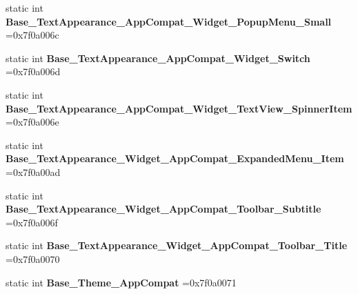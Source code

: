 \begin{DoxyCompactItemize}
\item 
\mbox{\label{classandroid_1_1support_1_1v7_1_1cardview_1_1R_1_1style_a61a73ef321f041edaa8a9b8c5e36ab07}} 
static int {\bfseries Base\+\_\+\+Text\+Appearance\+\_\+\+App\+Compat\+\_\+\+Widget\+\_\+\+Popup\+Menu\+\_\+\+Small} =0x7f0a006c
\item 
\mbox{\label{classandroid_1_1support_1_1v7_1_1cardview_1_1R_1_1style_a45c6f447e35547cd5bc3dd91d683f00c}} 
static int {\bfseries Base\+\_\+\+Text\+Appearance\+\_\+\+App\+Compat\+\_\+\+Widget\+\_\+\+Switch} =0x7f0a006d
\item 
\mbox{\label{classandroid_1_1support_1_1v7_1_1cardview_1_1R_1_1style_a775ab82cf9e9d3502a6b4f7064177639}} 
static int {\bfseries Base\+\_\+\+Text\+Appearance\+\_\+\+App\+Compat\+\_\+\+Widget\+\_\+\+Text\+View\+\_\+\+Spinner\+Item} =0x7f0a006e
\item 
\mbox{\label{classandroid_1_1support_1_1v7_1_1cardview_1_1R_1_1style_acaa1e5046618f65a78f1b80e648cd4ee}} 
static int {\bfseries Base\+\_\+\+Text\+Appearance\+\_\+\+Widget\+\_\+\+App\+Compat\+\_\+\+Expanded\+Menu\+\_\+\+Item} =0x7f0a00ad
\item 
\mbox{\label{classandroid_1_1support_1_1v7_1_1cardview_1_1R_1_1style_ab5e8f557863792e480d5cff2ed85e661}} 
static int {\bfseries Base\+\_\+\+Text\+Appearance\+\_\+\+Widget\+\_\+\+App\+Compat\+\_\+\+Toolbar\+\_\+\+Subtitle} =0x7f0a006f
\item 
\mbox{\label{classandroid_1_1support_1_1v7_1_1cardview_1_1R_1_1style_ad69c3285dde1661bfda00d53640876aa}} 
static int {\bfseries Base\+\_\+\+Text\+Appearance\+\_\+\+Widget\+\_\+\+App\+Compat\+\_\+\+Toolbar\+\_\+\+Title} =0x7f0a0070
\item 
\mbox{\label{classandroid_1_1support_1_1v7_1_1cardview_1_1R_1_1style_a06e8792501459f584f80dc39da6efc72}} 
static int {\bfseries Base\+\_\+\+Theme\+\_\+\+App\+Compat} =0x7f0a0071

\end{DoxyCompactItemize}
